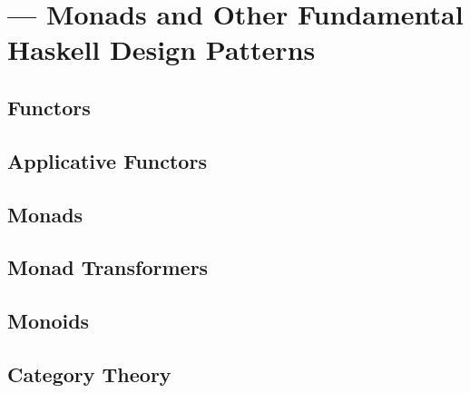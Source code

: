\chapter[--- Monads and Other Fundamental Haskell Design Patterns]{--- Monads and Other Fundamental Haskell Design Patterns}
\label{app:monads}

\section{Functors}

\section{Applicative Functors}

\section{Monads}

\section{Monad Transformers}

\section{Monoids}

\section{Category Theory}